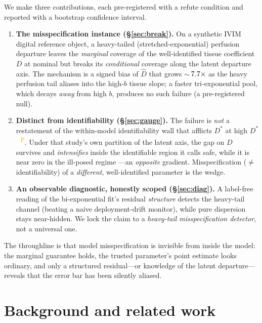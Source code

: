 \documentclass[11pt]{article}
\newcommand{\Dstar}{D^{*}}
\newcommand{\PROV}{\textsuperscript{\textcolor{orange}{\,P}}}
\begin{document}
We make three contributions, each pre-registered with a refute condition and
reported with a bootstrap confidence interval.
\begin{enumerate}\itemsep2pt
\item \textbf{The misspecification instance (\S\ref{sec:break}).} On a synthetic
  IVIM digital reference object, a heavy-tailed (stretched-exponential) perfusion
  departure leaves the \emph{marginal} coverage of the well-identified tissue
  coefficient $D$ at nominal but breaks its \emph{conditional} coverage along the
  latent departure axis. The mechanism is a signed bias of $\hat{D}$ that grows
  $\sim$\,$7.7\times$ as the heavy perfusion tail aliases into the high-$b$
  tissue slope; a faster tri-exponential pool, which decays \emph{away} from high
  $b$, produces no such failure (a pre-registered null).
\item \textbf{Distinct from identifiability (\S\ref{sec:gauge}).} The failure is
  \emph{not} a restatement of the within-model identifiability wall that afflicts
  $\Dstar$ at high $\Dstar$~\citep{gauge}\PROV{}. Under that study's own partition
  of the latent axis, the gap on $D$ survives and \emph{intensifies} inside the
  identifiable region it calls safe, while it is near zero in the ill-posed regime
  ---an \emph{opposite} gradient. Misspecification ($\neq$\,identifiability) of a
  \emph{different}, well-identified parameter is the wedge.
\item \textbf{An observable diagnostic, honestly scoped (\S\ref{sec:diag}).} A
  label-free reading of the bi-exponential fit's residual \emph{structure} detects
  the heavy-tail channel (beating a naive deployment-drift monitor), while pure
  dispersion stays near-hidden. We lock the claim to a \emph{heavy-tail
  misspecification detector}, not a universal one.
\end{enumerate}

The throughline is that model misspecification is invisible from inside the model:
the marginal guarantee holds, the trusted parameter's point estimate looks
ordinary, and only a structured residual---or knowledge of the latent
departure---reveals that the error bar has been silently aliased.

\section{Background and related work}\label{sec:bg}
\end{document}
